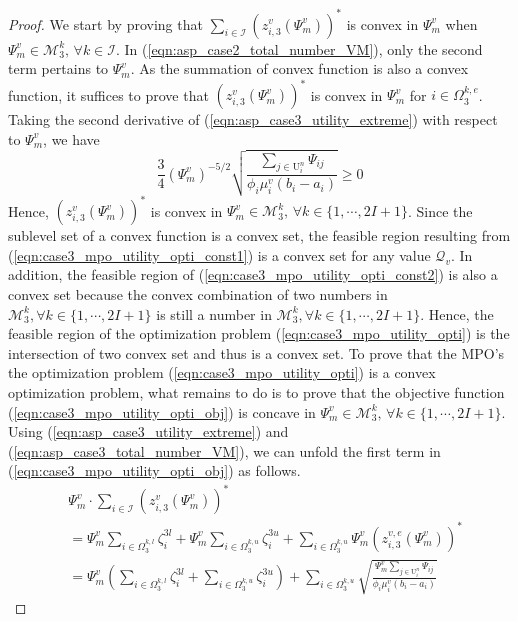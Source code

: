 \documentclass[conference]{IEEEtran}
\begin{document}
\begin{proof}
We start by proving that $\sum_{i \in \mathcal{I}} (z_{i,3}^v(\Psi_m^v))^*$ is convex in $\Psi_m^v$ when $\Psi_m^v \in \mathcal{M}_3^k,\, \forall k \in \mathcal{I}$. In (\ref{eqn:asp_case2_total_number_VM}), only the second term pertains to $\Psi_m^v$. As the summation of convex function is also a convex function, it suffices to prove that $(z_{i,3}^v(\Psi_m^v))^*$ is convex in $\Psi_m^v$ for $i \in \Omega_3^{k,e}$. Taking the second derivative of (\ref{eqn:asp_case3_utility_extreme}) with respect to $\Psi_m^v$, we have 
\begin{equation}
\frac{3}{4}(\Psi_m^v)^{-5/2}\sqrt{\frac{\sum_{j \in \mathrm{U}_i^n}\Psi_{ij}}{\phi_i \mu_i^v(b_i-a_i)}}  \geq 0 
\end{equation}
Hence, $(z_{i,3}^v(\Psi_m^v))^*$ is convex in $\Psi_m^v \in \mathcal{M}_3^k,\, \forall k \in \{1,\cdots, 2I+1\}$. Since the sublevel set of a convex function is a convex set, the feasible region resulting from (\ref{eqn:case3_mpo_utility_opti_const1}) is a convex set for any value $\mathcal{Q}_v$. In addition, the feasible region of (\ref{eqn:case3_mpo_utility_opti_const2}) is also a convex set because the convex combination of two numbers in $\mathcal{M}_3^k, \forall k \in \{1, \cdots, 2I+1\}$ is still a number in $\mathcal{M}_3^k, \forall k \in \{1, \cdots, 2I+1\}$. Hence, the feasible region of the optimization problem (\ref{eqn:case3_mpo_utility_opti}) is the intersection of two convex set and thus is a convex set. To prove that the MPO's the optimization problem (\ref{eqn:case3_mpo_utility_opti}) is a convex optimization problem, what remains to do is to prove that the objective function (\ref{eqn:case3_mpo_utility_opti_obj}) is concave in $\Psi_m^v \in \mathcal{M}_3^k,\, \forall k \in \{1,\cdots, 2I+1\}$. Using (\ref{eqn:asp_case3_utility_extreme}) and (\ref{eqn:asp_case3_total_number_VM}), we can unfold the first term in (\ref{eqn:case3_mpo_utility_opti_obj}) as follows. 
\begin{align} \label{eqn:mpo_case3_utility_first_term}
&\Psi_m^v \cdot \sum_{i \in \mathcal{I}} (z_{i,3}^v(\Psi_m^v))^* \\
&= \Psi_m^v\sum_{i\in \Omega_3^{k,l}}\zeta_i^{3l} + \Psi_m^v\sum_{i\in \Omega_3^{k,u}}\zeta_i^{3u} + \sum_{i \in \Omega_3^{k,u}}\Psi_m^v(z_{i,3}^{v,e}(\Psi_m^v))^* \nonumber\\
& = \Psi_m^v (\sum_{i\in \Omega_3^{k,l}}\zeta_i^{3l} + \sum_{i\in \Omega_3^{k,u}}\zeta_i^{3u}) +\sum_{i \in \Omega_3^{k,u}} \sqrt{\frac{\Psi_m^v\sum_{j \in \mathrm{U}_i^n}\Psi_{ij}}{\phi_i \mu_i^v(b_i-a_i)}}  \nonumber

\end{align}
\end{proof}
\end{document}
